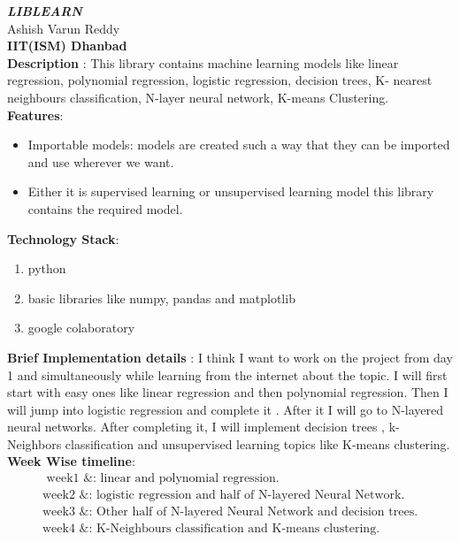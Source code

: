 \documentclass{article}
\begin{document}
\begin{flushleft}
	
	\huge {\textbf{\textit{LIBLEARN}}}\\[1.5cm]	
	\small Ashish Varun Reddy \\[0.10cm]
	\textbf{IIT(ISM) Dhanbad}\\[0.55cm]
	\textbf{Description} : This library contains machine learning models like linear regression, polynomial regression, logistic regression, decision trees, K- nearest neighbours classification, N-layer neural network, K-means Clustering.\\[0.50cm]
	\textbf{Features}: \\[0.2cm]
	\begin{itemize}
		\item Importable models: models are created such a way that they can be imported and use wherever we want.
		\item Either it is supervised learning or unsupervised learning model this library contains the required model.
	\end{itemize}
	\textbf{Technology Stack}: \\[0.220cm]
	\begin{enumerate}
		\item python
		\item basic libraries like numpy, pandas and matplotlib
		\item google colaboratory
	\end{enumerate}
\textbf{Brief Implementation details} : I think I want to work on the project from day 1 and simultaneously while learning from the internet about the topic. I will first start with easy ones like linear regression and then polynomial regression. Then I will jump into logistic regression and complete it . After it I will go to N-layered neural networks. After completing it, I will implement decision trees , k-Neighbors classification and unsupervised learning topics like K-means clustering.\\[0.60cm]

\renewcommand{\labelitemi}{}
\textbf{Week Wise timeline}: \\[0.5cm]
\begin{align}
\text{ week1 &: linear and polynomial regression.}\\
\text{week2 &: logistic regression and half of N-layered Neural Network.}\\
\text{week3 &: Other half of N-layered Neural Network and decision trees.}\\
\text{week4 &: K-Neighbours classification and K-means clustering.}\\
\end{align}


\end{flushleft}
\end{document}
